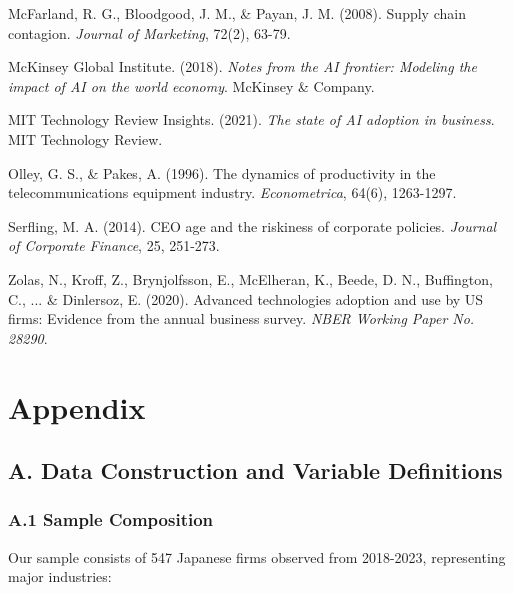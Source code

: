\documentclass[12pt, a4paper]{article}
\begin{document}
\begin{thebibliography}{99}
McFarland, R. G., Bloodgood, J. M., \& Payan, J. M. (2008). Supply chain contagion. \textit{Journal of Marketing}, 72(2), 63-79.

McKinsey Global Institute. (2018). \textit{Notes from the AI frontier: Modeling the impact of AI on the world economy}. McKinsey \& Company.

MIT Technology Review Insights. (2021). \textit{The state of AI adoption in business}. MIT Technology Review.

Olley, G. S., \& Pakes, A. (1996). The dynamics of productivity in the telecommunications equipment industry. \textit{Econometrica}, 64(6), 1263-1297.

Serfling, M. A. (2014). CEO age and the riskiness of corporate policies. \textit{Journal of Corporate Finance}, 25, 251-273.

Zolas, N., Kroff, Z., Brynjolfsson, E., McElheran, K., Beede, D. N., Buffington, C., ... \& Dinlersoz, E. (2020). Advanced technologies adoption and use by US firms: Evidence from the annual business survey. \textit{NBER Working Paper No. 28290}.

\end{thebibliography}

\newpage

\section*{Appendix}

\subsection*{A. Data Construction and Variable Definitions}

\subsubsection*{A.1 Sample Composition}

Our sample consists of 547 Japanese firms observed from 2018-2023, representing major industries:
\end{document}
